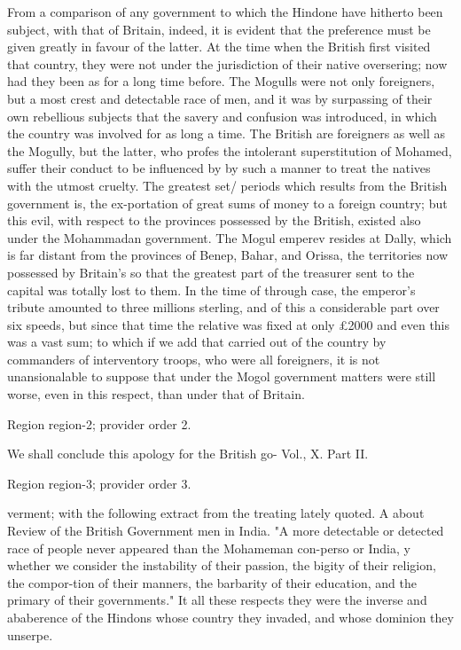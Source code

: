 \documentclass[11pt]{article}
\begin{document}
From a comparison of any government to which the Hindone have hitherto been subject, with that of Britain, indeed, it is evident that the preference must be given greatly in favour of the latter. At the time when the British first visited that country, they were not under the jurisdiction of their native oversering; now had they been as for a long time before. The Mogulls were not only foreigners, but a most crest and detectable race of men, and it was by surpassing of their own rebellious subjects that the savery and confusion was introduced, in which the country was involved for as long a time. The British are foreigners as well as the Mogully, but the latter, who profes the intolerant superstitution of Mohamed, suffer their conduct to be influenced by by such a manner to treat the natives with the utmost cruelty. The greatest set/ periods which results from the British government is, the ex-portation of great sums of money to a foreign country; but this evil, with respect to the provinces possessed by the British, existed also under the Mohammadan government. The Mogul emperev resides at Dally, which is far distant from the provinces of Benep, Bahar, and Orissa, the territories now possessed by Britain’s so that the greatest part of the treasurer sent to the capital was totally lost to them. In the time of through case, the emperor’s tribute amounted to three millions sterling, and of this a considerable part over six speeds, but since that time the relative was fixed at only £2000 and even this was a vast sum; to which if we add that carried out of the country by commanders of interventory troops, who were all foreigners, it is not unansionalable to suppose that under the Mogol government matters were still worse, even in this respect, than under that of Britain.
\par

{\scriptsize\color{gray} Region region-2; provider order 2.\par}
\medskip

We shall conclude this apology for the British go- Vol., X. Part II.
\par

{\scriptsize\color{gray} Region region-3; provider order 3.\par}
\medskip

verment; with the following extract from the treating lately quoted. A about Review of the British Government men in India. "A more detectable or detected race of people never appeared than the Mohameman con-perso or India, y whether we consider the instability of their passion, the bigity of their religion, the compor-tion of their manners, the barbarity of their education, and the primary of their governments." It all these respects they were the inverse and ababerence of the Hindons whose country they invaded, and whose dominion they unserpe.
\par
\end{document}
